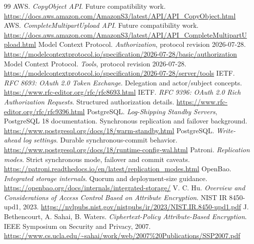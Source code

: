 \begin{thebibliography}{99}
 AWS. \emph{CopyObject API}. Future compatibility work. \url{https://docs.aws.amazon.com/AmazonS3/latest/API/API_CopyObject.html}
 AWS. \emph{CompleteMultipartUpload API}. Future compatibility work. \url{https://docs.aws.amazon.com/AmazonS3/latest/API/API_CompleteMultipartUpload.html}
 Model Context Protocol. \emph{Authorization}, protocol revision 2026-07-28. \url{https://modelcontextprotocol.io/specification/2026-07-28/basic/authorization}
 Model Context Protocol. \emph{Tools}, protocol revision 2026-07-28. \url{https://modelcontextprotocol.io/specification/2026-07-28/server/tools}
 IETF. \emph{RFC 8693: OAuth 2.0 Token Exchange}. Delegation and actor/subject concepts. \url{https://www.rfc-editor.org/rfc/rfc8693.html}
 IETF. \emph{RFC 9396: OAuth 2.0 Rich Authorization Requests}. Structured authorization details. \url{https://www.rfc-editor.org/rfc/rfc9396.html}
 PostgreSQL. \emph{Log-Shipping Standby Servers}, PostgreSQL 18 documentation. Synchronous replication and failover background. \url{https://www.postgresql.org/docs/18/warm-standby.html}
 PostgreSQL. \emph{Write-ahead log settings}. Durable synchronous-commit behavior. \url{https://www.postgresql.org/docs/18/runtime-config-wal.html}
 Patroni. \emph{Replication modes}. Strict synchronous mode, failover and commit caveats. \url{https://patroni.readthedocs.io/en/latest/replication_modes.html}
 OpenBao. \emph{Integrated storage internals}. Quorum and deployment-size guidance. \url{https://openbao.org/docs/internals/integrated-storage/}
 V. C. Hu. \emph{Overview and Considerations of Access Control Based on Attribute Encryption}. NIST IR 8450-upd1, 2023. \url{https://nvlpubs.nist.gov/nistpubs/ir/2023/NIST.IR.8450-upd1.pdf}
 J. Bethencourt, A. Sahai, B. Waters. \emph{Ciphertext-Policy Attribute-Based Encryption}. IEEE Symposium on Security and Privacy, 2007. \url{https://www.cs.ucla.edu/~sahai/work/web/2007%20Publications/SSP2007.pdf}
\end{thebibliography}
